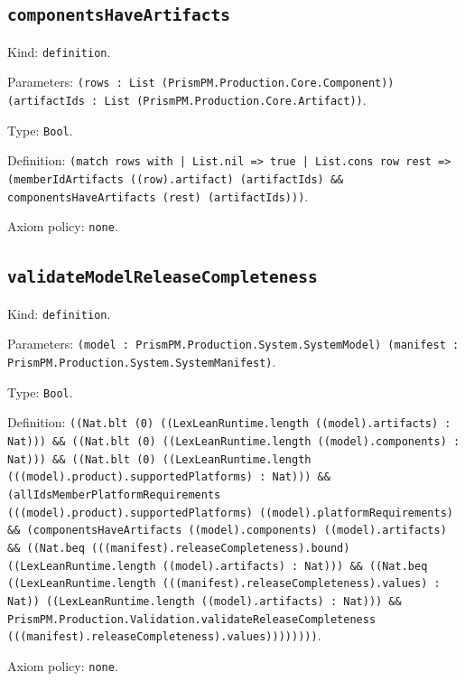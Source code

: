 \documentclass[11pt]{article}
\begin{document}
\subsection*{\texttt{componentsHaveArtifacts}}
\noindent Kind: \texttt{definition}.\par
\noindent Parameters: \texttt{(rows : List (PrismPM.Production.Core.Component)) (artifactIds : List (PrismPM.Production.Core.Artifact))}.\par
\noindent Type: \texttt{Bool}.\par
\noindent Definition: \texttt{(match rows with | List.nil => true | List.cons row rest => (memberIdArtifacts ((row).artifact) (artifactIds) \&\& componentsHaveArtifacts (rest) (artifactIds)))}.\par
\noindent Axiom policy: \texttt{none}.\par
\subsection*{\texttt{validateModelReleaseCompleteness}}
\noindent Kind: \texttt{definition}.\par
\noindent Parameters: \texttt{(model : PrismPM.Production.System.SystemModel) (manifest : PrismPM.Production.System.SystemManifest)}.\par
\noindent Type: \texttt{Bool}.\par
\noindent Definition: \texttt{((Nat.blt (0) ((LexLeanRuntime.length ((model).artifacts) : Nat))) \&\& ((Nat.blt (0) ((LexLeanRuntime.length ((model).components) : Nat))) \&\& ((Nat.blt (0) ((LexLeanRuntime.length (((model).product).supportedPlatforms) : Nat))) \&\& (allIdsMemberPlatformRequirements (((model).product).supportedPlatforms) ((model).platformRequirements) \&\& (componentsHaveArtifacts ((model).components) ((model).artifacts) \&\& ((Nat.beq (((manifest).releaseCompleteness).bound) ((LexLeanRuntime.length ((model).artifacts) : Nat))) \&\& ((Nat.beq ((LexLeanRuntime.length (((manifest).releaseCompleteness).values) : Nat)) ((LexLeanRuntime.length ((model).artifacts) : Nat))) \&\& PrismPM.Production.Validation.validateReleaseCompleteness (((manifest).releaseCompleteness).values))))))))}.\par
\noindent Axiom policy: \texttt{none}.\par
\end{document}
